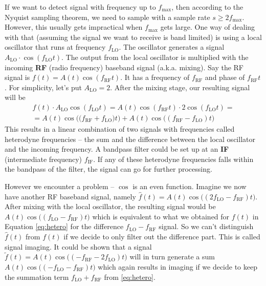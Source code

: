\documentclass[a4paper,12pt,twoside,openright]{report}
\begin{document}
If we want to detect signal with frequency up to $f_\text{max}$, then according to the Nyquist sampling theorem, we need to sample with a sample rate $s \geq 2 f_\text{max}$. However, this usually gets impractical when $f_\text{max}$ gets large. One way of dealing with that (assuming the signal we want to receive is band limited) is using a local oscillator that runs at frequency $f_\text{LO}$. The oscillator generates a signal $A_\text{LO} \cdot \cos(f_\text{LO} t)$. The output from the local oscillator is multiplied with the incoming \textbf{RF} (radio frequency) baseband signal (a.k.a. mixing). Say the RF signal is $f(t) = A(t) \cos(f_\text{RF} t)$. It has a frequency of $f_\text{RF}$ and phase of $f_\text{RF} t$. For simplicity, let's put $A_\text{LO} = 2$. After the mixing stage, our resulting signal will be
\begin{multline}
\label{eq:hetero}
f(t) \cdot A_\text{LO} \cos(f_\text{LO} t) =  A(t) \cos(f_\text{RF} t) \cdot 2 \cos(f_\text{LO} t) = \\
=  A(t) \cos\big( (f_\text{RF} + f_\text{LO} \big) t\big) + A(t) \cos\big( (f_\text{RF} - f_\text{LO}) t \big)
\end{multline}
This results in a linear combination of two signals with frequencies called heterodyne frequencies -- the sum and the difference between the local oscillator and the incoming frequency. A bandpass filter could be set up at an \textbf{IF} (intermediate frequency) $f_\text{IF}$. If any of these heterodyne frequencies falls within the bandpass of the filter, the signal can go for further processing.

However we encounter a problem -- $\cos$ is an even function. Imagine we now have another RF baseband signal, namely $\hat{f}(t) = A(t) \cos\big( (2 f_\text{LO} - f_\text{RF}) t\big)$. After mixing with the local oscillator, the resulting signal would be $A(t) \cos\big( (f_\text{LO} - f_\text{RF}) t \big)$ which is equivalent to what we obtained for $f(t)$ in Equation \ref{eq:hetero} for the difference $f_\text{LO} - f_\text{RF}$ signal. So we can't distinguish $\hat{f}(t)$ from $f(t)$ if we decide to only filter out the difference part. This is called signal imaging. It could be shown that a signal $\tilde{f}(t) = A(t) \cos\big( (- f_\text{RF} - 2 f_\text{LO}) t\big)$ will in turn generate a sum $A(t) \cos\big( ( - f_\text{LO} - f_\text{RF}) t \big)$ which again results in imaging if we decide to keep the summation term $f_\text{LO} + f_\text{RF}$ from \ref{eq:hetero}.
\end{document}
